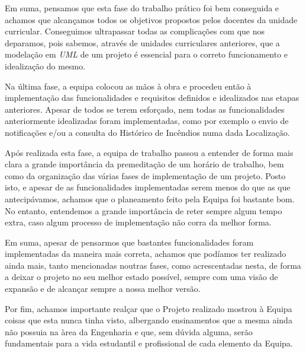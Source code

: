 \documentclass[a4paper,12pt]{scrreprt}
\newcommand{\tab}{
    \hspace{1cm}}
\begin{document}
\tab Em suma, pensamos que esta fase do trabalho prático foi bem conseguida e achamos que alcançamos todos os objetivos propostos pelos docentes da unidade curricular. Conseguimos ultrapassar todas as complicações com que nos deparamos, pois sabemos, através de unidades curriculares anteriores, que a modelação em \textit{UML} de um projeto é essencial para o correto funcionamento e idealização do mesmo. 


\vspace{0.5cm}
\tab Na última fase, a equipa colocou as mãos à obra e procedeu então à implementação das funcionalidades e requisitos definidos e idealizados nas etapas anteriores. Apesar de todos se terem esforçado, nem todas as funcionalidades anteriormente idealizadas foram implementadas, como por exemplo o envio de notificações e/ou a consulta do Histórico de Incêndios numa dada Localização.

\tab Após realizada esta fase, a equipa de trabalho passou a entender de forma mais clara a grande importância da premeditação de um horário de trabalho, bem como da organização das várias fases de implementação de um projeto. Posto isto, e apesar de as funcionalidades implementadas serem menos do que as que antecipávamos, achamos que o planeamento feito pela Equipa foi bastante bom. No entanto, entendemos a grande importância de reter sempre algum tempo extra, caso algum processo de implementação não corra da melhor forma. 

\tab Em suma, apesar de pensarmos que bastantes funcionalidades foram implementadas da maneira  mais correta, achamos que podíamos ter realizado ainda mais, tanto mencionadas noutras fases, como acrescentadas nesta, de forma a deixar o projeto no seu melhor estado possível, sempre com uma visão de expansão e de alcançar sempre a nossa melhor versão.

\tab Por fim, achamos importante realçar que o Projeto realizado mostrou à Equipa coisas que esta nunca tinha visto, albergando ensinamentos que a mesma ainda não possuia na àrea da Engenharia e que, sem dúvida alguma, serão fundamentais para a vida estudantil e profissional de cada elemento da Equipa.

\vspace{0.5cm}



\end{document}
